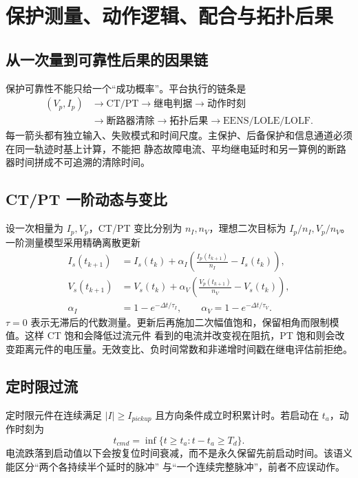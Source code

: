 \section{保护测量、动作逻辑、配合与拓扑后果}\label{sec:rel-protection-chain}

\subsection{从一次量到可靠性后果的因果链}
保护可靠性不能只给一个“成功概率”。平台执行的链条是
\begin{equation}
\begin{aligned}
 (V_p,I_p)&\longrightarrow \text{CT/PT}\longrightarrow \text{继电判据}
 \longrightarrow \text{动作时刻}\\
 &\longrightarrow \text{断路器清除}\longrightarrow \text{拓扑后果}
 \longrightarrow \text{EENS/LOLE/LOLF}.
\end{aligned}
\end{equation}
每一箭头都有独立输入、失败模式和时间尺度。主保护、后备保护和信息通道必须在同一轨迹时基上计算，不能把
静态故障电流、平均继电延时和另一算例的断路器时间拼成不可追溯的清除时间。

\subsection{CT/PT 一阶动态与变比}
设一次相量为 $I_p,V_p$，CT/PT 变比分别为 $n_I,n_V$，理想二次目标为
$I_p/n_I,V_p/n_V$。一阶测量模型采用精确离散更新
\begin{align}
 I_s(t_{k+1})&=I_s(t_k)+\alpha_I\left(\frac{I_p(t_{k+1})}{n_I}-I_s(t_k)\right),\\
 V_s(t_{k+1})&=V_s(t_k)+\alpha_V\left(\frac{V_p(t_{k+1})}{n_V}-V_s(t_k)\right),\\
 \alpha_I&=1-e^{-\Delta t/\tau_I},\qquad
 \alpha_V=1-e^{-\Delta t/\tau_V}.
\end{align}
$\tau=0$ 表示无滞后的代数测量。更新后再施加二次幅值饱和，保留相角而限制模值。这样 CT 饱和会降低过流元件
看到的电流并改变视在阻抗，PT 饱和则会改变距离元件的电压量。无效变比、负时间常数和非递增时间戳在继电评估前拒绝。

\subsection{定时限过流}
定时限元件在连续满足 $|I|\ge I_{pickup}$ 且方向条件成立时积累计时。若启动在 $t_a$，动作时刻为
\begin{equation}
 t_{cmd}=\inf\{t\ge t_a:t-t_a\ge T_d\}.
\end{equation}
电流跌落到启动值以下会按复位时间衰减，而不是永久保留先前启动时间。该语义能区分“两个各持续半个延时的脉冲”
与“一个连续完整脉冲”，前者不应误动作。

